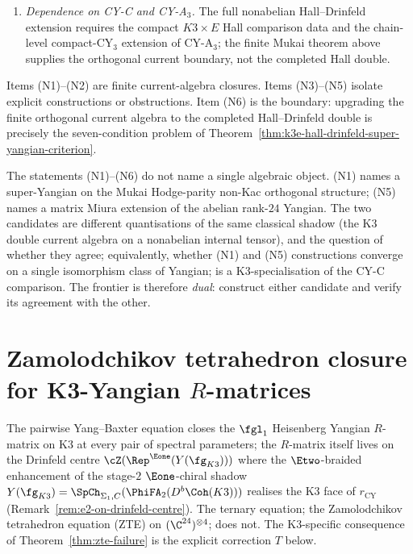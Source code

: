 \begin{theorem}
\begin{enumerate}[label=\textup{(N\arabic*)}]
 \item \emph{Dependence on CY-C and CY-A$_3$.} The full nonabelian Hall--Drinfeld extension requires the compact $K3\times E$ Hall comparison data and the chain-level compact-CY$_3$ extension of CY-A$_3$; the finite Mukai theorem above supplies the orthogonal current boundary, not the completed Hall double.
\end{enumerate}
Items \textup{(N1)}--\textup{(N2)} are finite current-algebra
closures. Items \textup{(N3)}--\textup{(N5)} isolate explicit
constructions or obstructions. Item \textup{(N6)} is the boundary:
upgrading the finite orthogonal current algebra to the completed
Hall--Drinfeld double is precisely the seven-condition problem of
Theorem~\ref{thm:k3e-hall-drinfeld-super-yangian-criterion}.
\end{theorem}

\begin{remark}
\label{rem:nonabelian-k3-yangian-not-single-object}
The statements (N1)--(N6) do not name a single algebraic object. (N1) names a super-Yangian on the Mukai Hodge-parity non-Kac orthogonal structure; (N5) names a matrix Miura extension of the abelian rank-$24$ Yangian. The two candidates are different quantisations of the same classical shadow (the K3 double current algebra on a nonabelian internal tensor), and the question of whether they agree; equivalently, whether (N1) and (N5) constructions converge on a single isomorphism class of Yangian; is a K3-specialisation of the CY-C comparison. The frontier is therefore \emph{dual}: construct either candidate and verify its agreement with the other.
\end{remark}

\section{Zamolodchikov tetrahedron closure for K3-Yangian \texorpdfstring{$R$}{R}-matrices}
\label{sec:zte-closure-k3-yangian}

The pairwise Yang--Baxter equation closes the $\fgl_1$ Heisenberg Yangian $R$-matrix on K3 at every pair of spectral parameters; the $R$-matrix itself lives on the Drinfeld centre $\cZ(\Rep^{\Eone}(Y(\fg_{K3})))$ where the $\Etwo$-braided enhancement of the stage-$2$ $\Eone$-chiral shadow $Y(\fg_{K3}) = \SpCh_{\Sigma_1, C}(\PhiFA_2(D^b\Coh(K3)))$ realises the K3 face of $r_{\mathrm{CY}}$ (Remark~\ref{rem:e2-on-drinfeld-centre}). The ternary equation; the Zamolodchikov tetrahedron equation (ZTE) on $(\C^{24})^{\otimes 4}$; does not. The K3-specific consequence of Theorem~\ref{thm:zte-failure} is the explicit correction $T$ below.

